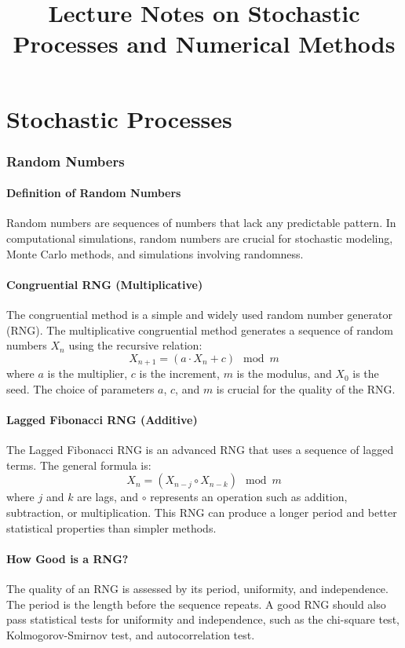 \documentclass[12pt]{article}
\title{Lecture Notes on Stochastic Processes and Numerical Methods}
\author{}
\date{}
\begin{document}
\maketitle
\tableofcontents
\newpage

\part{Stochastic Processes}
\section{Random Numbers}
\subsection{Definition of Random Numbers}
Random numbers are sequences of numbers that lack any predictable pattern. In computational simulations, random numbers are crucial for stochastic modeling, Monte Carlo methods, and simulations involving randomness.

\subsection{Congruential RNG (Multiplicative)}
The congruential method is a simple and widely used random number generator (RNG). The multiplicative congruential method generates a sequence of random numbers \( X_n \) using the recursive relation:
\[
X_{n+1} = (a \cdot X_n + c) \mod m
\]
where \( a \) is the multiplier, \( c \) is the increment, \( m \) is the modulus, and \( X_0 \) is the seed. The choice of parameters \( a \), \( c \), and \( m \) is crucial for the quality of the RNG.

\subsection{Lagged Fibonacci RNG (Additive)}
The Lagged Fibonacci RNG is an advanced RNG that uses a sequence of lagged terms. The general formula is:
\[
X_n = (X_{n-j} \circ X_{n-k}) \mod m
\]
where \( j \) and \( k \) are lags, and \( \circ \) represents an operation such as addition, subtraction, or multiplication. This RNG can produce a longer period and better statistical properties than simpler methods.

\subsection{How Good is a RNG?}
The quality of an RNG is assessed by its period, uniformity, and independence. The period is the length before the sequence repeats. A good RNG should also pass statistical tests for uniformity and independence, such as the chi-square test, Kolmogorov-Smirnov test, and autocorrelation test.
\end{document}
